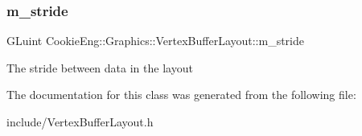 \subsubsection{m\+\_\+stride}
{\footnotesize\ttfamily G\+Luint Cookie\+Eng\+::\+Graphics\+::\+Vertex\+Buffer\+Layout\+::m\+\_\+stride\hspace{0.3cm}{\ttfamily [protected]}}

The stride between data in the layout 

The documentation for this class was generated from the following file\+:\begin{DoxyCompactItemize}
\item 
include/Vertex\+Buffer\+Layout.\+h\end{DoxyCompactItemize}
